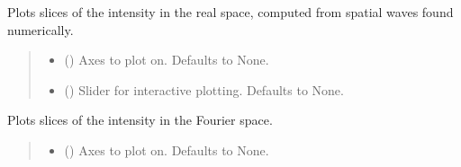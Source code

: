\documentclass[letterpaper,10pt,english]{sphinxmanual}
\begin{document}
\begin{fulllineitems}
\begin{fulllineitems}
\label{\detokenize{source/Box:Box.Box.plot_approximate_intensity_slices}}
\pysigstartsignatures
\pysiglinewithargsret
{}
{\sphinxparamcomma {}}
{}
\pysigstopsignatures
\sphinxAtStartPar
Plots slices of the intensity in the real space, computed from spatial waves found numerically.
\begin{quote}\begin{description}
\begin{itemize}
\item {} 
\sphinxAtStartPar
{} (\sphinxstyleliteralemphasis{\sphinxupquote{, }}) \textendash{} Axes to plot on. Defaults to None.

\item {} 
\sphinxAtStartPar
{} (\sphinxstyleliteralemphasis{\sphinxupquote{, }}) \textendash{} Slider for interactive plotting. Defaults to None.

\end{itemize}

\end{description}\end{quote}

\end{fulllineitems}


\begin{fulllineitems}
\label{\detokenize{source/Box:Box.Box.plot_intensity_fourier_space_slices}}
\pysigstartsignatures
\pysiglinewithargsret
{}
{\sphinxparamcomma {}}
{}
\pysigstopsignatures
\sphinxAtStartPar
Plots slices of the intensity in the Fourier space.
\begin{quote}\begin{description}
\begin{itemize}
\item {} 
\sphinxAtStartPar
{} (\sphinxstyleliteralemphasis{\sphinxupquote{, }}) \textendash{} Axes to plot on. Defaults to None.


\end{itemize}
\end{description}
\end{quote}
\end{fulllineitems}
\end{fulllineitems}
\end{document}
